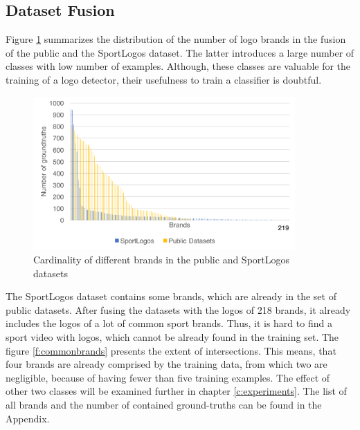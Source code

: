 \subsection{Dataset Fusion}\label{ss:datasetfusion}
Figure \ref{f:branddistribution} summarizes the distribution of the number of logo brands in the fusion of the public and the SportLogos dataset. The latter introduces a large number of classes with low number of examples. Although, these classes are valuable for the training of a logo detector, their usefulness to train a classifier is doubtful.
\begin{figure}
  \centering
  \includegraphics[width=100mm]{images/mt/branddistribution.png}
  \caption{Cardinality of different brands in the public and SportLogos datasets}
  \label{f:branddistribution}
\end{figure}
The SportLogos dataset contains some brands, which are already in the set of public datasets. After fusing the datasets with the logos of 218 brands, it already includes the logos of a lot of common sport brands. Thus, it is hard to find a sport video with logos, which cannot be already found in the training set. The figure \ref{f:commonbrands} presents the extent of intersections. This means, that four brands are already comprised by the training data, from which two are negligible, because of having fewer than five training examples. The effect of other two classes will be examined further in chapter \ref{c:experiments}. The list of all brands and the number of contained ground-truths can be found in the Appendix.

